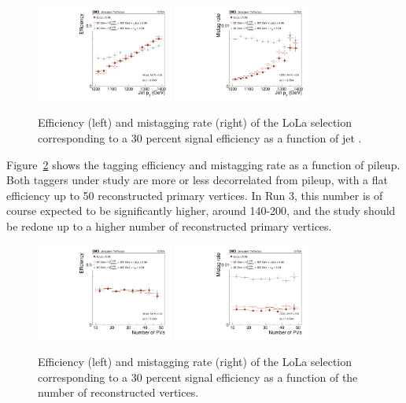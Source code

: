 \begin{figure}[htb]
\centering
\includegraphics[width=0.4\textwidth]{figures/vtagging/AN-18-099/validation/WtagSigEffvsjpt.pdf}
\includegraphics[width=0.4\textwidth]{figures/vtagging/AN-18-099/validation/QCDMistagvsjpt.pdf}
\caption{Efficiency (left) and mistagging rate (right) of the LoLa selection corresponding to a 30 percent signal efficiency as a function of jet \PT.}
\label{fig:lola:eff_val_pt}
\end{figure}
Figure~\ref{fig:lola:eff_val_pu} shows the tagging efficiency and mistagging rate as a function of pileup. Both taggers under study are more or less decorrelated from pileup, with a flat efficiency up to 50 reconstructed primary vertices. In Run 3, this number is of course expected to be significantly higher, around 140-200, and the study should be redone up to a higher number of reconstructed primary vertices.
\begin{figure}[h!]
\centering
\includegraphics[width=0.4\textwidth]{figures/vtagging/AN-18-099/validation/WtagSigEffvsnPV.pdf}
\includegraphics[width=0.4\textwidth]{figures/vtagging/AN-18-099/validation/QCDMistagvsnPV.pdf}
\caption{Efficiency (left) and mistagging rate (right) of the LoLa selection corresponding to a 30 percent signal efficiency as a function of the number of reconstructed vertices.}
\label{fig:lola:eff_val_pu}
\end{figure}
\clearpage
